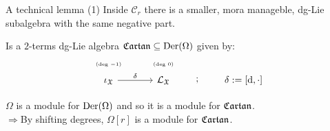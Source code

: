 \documentclass[beamer,10pt]{standalone}
\begin{document}
\begin{frame}{A technical lemma (1)}
  Inside $\mathcal{C}_r$ there is a smaller, mora manageble, dg-Lie subalgebra with the same negative part.
  \vfill \pause

  \begin{defblock}
  	Is a $2$-terms dg-Lie algebra $\mathfrak{Cartan} \subseteq \mathrm{Der}(\Omega)$ given by:
  \begin{displaymath}
	\begin{tikzcd}[ampersand replacement=\&,row sep = small]
		\text{\tiny (deg $-1$)} \& \text{\tiny (deg $0$)}\&[2em]
		\\[-.7em]
		\iota_{\X} \ar[r,"\delta"] \& \Lie_{\X} \ar[r,phantom,";"] \& \delta:= [\d, \cdot]
	\end{tikzcd}
  \end{displaymath}
  \end{defblock}
  \vfill \pause

  $\Omega$ is a module for $\mathrm{Der}(\Omega)$ and so it is a module for $\mathfrak{Cartan}$.
  \\
  $\Rightarrow$\quad By shifting degrees, $\Omega[r]$ is a module for $\mathfrak{Cartan}$.
  \vfill 

\end{frame}
\note[itemize]
{
	\item 
	\item 
}
\end{document}
